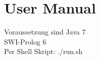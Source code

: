 
\chapter{User Manual} %

\label{UserManual} %


Voraussetzung sind Java 7\\
SWI-Prolog 6\\

Per Shell Skript: ./run.sh

